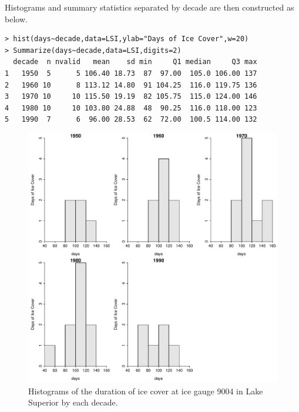 \documentclass[10pt,openany]{book}\usepackage[]{graphicx}\usepackage[]{color}
\makeatletter
\newenvironment{kframe}{%
 \def\at@end@of@kframe{}%
 \ifinner\ifhmode%
  \def\at@end@of@kframe{\end{minipage}}%
  \begin{minipage}{\columnwidth}%
 \fi\fi%
 \def\FrameCommand##1{\hskip\@totalleftmargin \hskip-\fboxsep
 \colorbox{shadecolor}{##1}\hskip-\fboxsep
     \hskip-\linewidth \hskip-\@totalleftmargin \hskip\columnwidth}%
 \MakeFramed {\advance\hsize-\width
   \@totalleftmargin\z@ \linewidth\hsize
   \@setminipage}}%
 {\par\unskip\endMakeFramed%
 \at@end@of@kframe}
\newenvironment{knitrout}{}{} %
\makeatother
\begin{document}
Histograms  and summary statistics separated by decade are then constructed as below.
\begin{knitrout}
\color{fgcolor}\begin{kframe}
\begin{verbatim}
> hist(days~decade,data=LSI,ylab="Days of Ice Cover",w=20)
> Summarize(days~decade,data=LSI,digits=2)
  decade  n nvalid   mean    sd min     Q1 median     Q3 max
1   1950  5      5 106.40 18.73  87  97.00  105.0 106.00 137
2   1960 10      8 113.12 14.80  91 104.25  116.0 119.75 136
3   1970 10     10 115.50 19.19  82 105.75  115.0 124.00 146
4   1980 10     10 103.80 24.88  48  90.25  116.0 118.00 123
5   1990  7      6  96.00 28.53  62  72.00  100.5 114.00 132
\end{verbatim}
\end{kframe}\begin{figure}[hbtp]

{\centering \includegraphics[width=.8\linewidth]{Figs/mhist1-1} 

}

\caption[Histograms of the duration of ice cover at ice gauge 9004 in Lake Superior by each decade]{Histograms of the duration of ice cover at ice gauge 9004 in Lake Superior by each decade.}\label{fig:mhist1}
\end{figure}


\end{knitrout}
\end{document}
